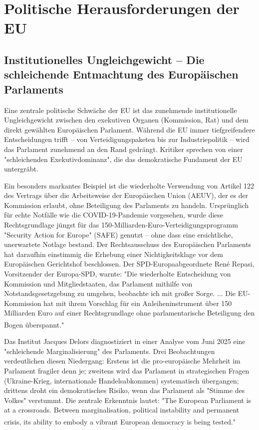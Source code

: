 \documentclass[12pt,a4paper]{article}
\newcommand{\footcite}[1]{\textsuperscript{\cite{#1}}}
\begin{document}
	\section{Politische Herausforderungen der EU}
	
	\subsection{Institutionelles Ungleichgewicht – Die schleichende Entmachtung des Europäischen Parlaments}
	
	Eine zentrale politische Schwäche der EU ist das zunehmende institutionelle Ungleichgewicht zwischen den exekutiven Organen (Kommission, Rat) und dem direkt gewählten Europäischen Parlament. Während die EU immer tiefgreifendere Entscheidungen trifft – von Verteidigungspaketen bis zur Industriepolitik – wird das Parlament zunehmend an den Rand gedrängt. Kritiker sprechen von einer "schleichenden Exekutivdominanz", die das demokratische Fundament der EU untergräbt.
	
	Ein besonders markantes Beispiel ist die wiederholte Verwendung von Artikel 122 des Vertrags über die Arbeitsweise der Europäischen Union (AEUV), der es der Kommission erlaubt, ohne Beteiligung des Parlaments zu handeln. Ursprünglich für echte Notfälle wie die COVID-19-Pandemie vorgesehen, wurde diese Rechtsgrundlage jüngst für das 150-Milliarden-Euro-Verteidigungsprogramm "Security Action for Europe" (SAFE) genutzt – ohne dass eine ersichtliche, unerwartete Notlage bestand. Der Rechtsausschuss des Europäischen Parlaments hat daraufhin einstimmig die Erhebung einer Nichtigkeitsklage vor dem Europäischen Gerichtshof beschlossen. Der SPD-Europaabgeordnete René Repasi, Vorsitzender der Europa-SPD, warnte: "Die wiederholte Entscheidung von Kommission und Mitgliedstaaten, das Parlament mithilfe von Notstandsgesetzgebung zu umgehen, beobachte ich mit großer Sorge. ... Die EU-Kommission hat mit ihrem Vorschlag für ein Anleiheninstrument über 150 Milliarden Euro auf einer Rechtsgrundlage ohne parlamentarische Beteiligung den Bogen überspannt."\footcite{Repasi2025}
	
	Das Institut Jacques Delors diagnostiziert in einer Analyse vom Juni 2025 eine "schleichende Marginalisierung" des Parlaments. Drei Beobachtungen verdeutlichen diesen Niedergang: Erstens ist die pro-europäische Mehrheit im Parlament fragiler denn je; zweitens wird das Parlament in strategischen Fragen (Ukraine-Krieg, internationale Handelsabkommen) systematisch übergangen; drittens droht ein demokratisches Risiko, wenn das Parlament als "Stimme des Volkes" verstummt. Die zentrale Erkenntnis lautet: "The European Parliament is at a crossroads. Between marginalisation, political instability and permanent crisis, its ability to embody a vibrant European democracy is being tested."\footcite{Delors2025}
	
\end{document}
